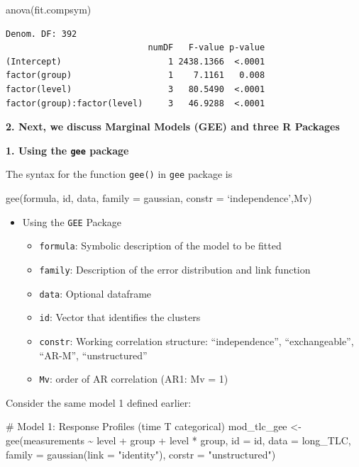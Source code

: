 \documentclass[
  letterpaper,
  DIV=11,
  numbers=noendperiod]{scrreprt}
\newenvironment{Shaded}{\begin{snugshade}}{\end{snugshade}}
\newcommand{\AttributeTok}[1]{\textcolor[rgb]{0.40,0.45,0.13}{#1}}
\newcommand{\CommentTok}[1]{\textcolor[rgb]{0.37,0.37,0.37}{#1}}
\newcommand{\FunctionTok}[1]{\textcolor[rgb]{0.28,0.35,0.67}{#1}}
\newcommand{\NormalTok}[1]{\textcolor[rgb]{0.00,0.23,0.31}{#1}}
\newcommand{\OtherTok}[1]{\textcolor[rgb]{0.00,0.23,0.31}{#1}}
\newcommand{\SpecialCharTok}[1]{\textcolor[rgb]{0.37,0.37,0.37}{#1}}
\newcommand{\StringTok}[1]{\textcolor[rgb]{0.13,0.47,0.30}{#1}}
\providecommand{\tightlist}{%
  \setlength{\itemsep}{0pt}\setlength{\parskip}{0pt}}\usepackage{longtable,booktabs,array}
\begin{document}
\begin{Shaded}
\begin{Highlighting}[]
\FunctionTok{anova}\NormalTok{(fit.compsym)}
\end{Highlighting}
\end{Shaded}

\begin{verbatim}
Denom. DF: 392 
                            numDF   F-value p-value
(Intercept)                     1 2438.1366  <.0001
factor(group)                   1    7.1161   0.008
factor(level)                   3   80.5490  <.0001
factor(group):factor(level)     3   46.9288  <.0001
\end{verbatim}

\textbf{2. Next, we discuss Marginal Models (GEE) and three R Packages }

\textbf{1. Using the \texttt{gee} package}

The syntax for the function \texttt{gee()} in \texttt{gee} package is

gee(formula, id, data, family = gaussian, constr = `independence',Mv)

\begin{itemize}
\tightlist
\item
  Using the \texttt{GEE} Package

  \begin{itemize}
  \tightlist
  \item
    \texttt{formula}: Symbolic description of the model to be fitted
  \item
    \texttt{family}: Description of the error distribution and link
    function
  \item
    \texttt{data}: Optional dataframe
  \item
    \texttt{id}: Vector that identifies the clusters
  \item
    \texttt{constr}: Working correlation structure: ``independence'',
    ``exchangeable'', ``AR-M'', ``unstructured''
  \item
    \texttt{Mv}: order of AR correlation (AR1: Mv = 1)
  \end{itemize}
\end{itemize}

Consider the same model 1 defined earlier:

\begin{Shaded}
\begin{Highlighting}[]
\CommentTok{\# Model 1: Response Profiles (time T categorical)}
\NormalTok{mod\_tlc\_gee }\OtherTok{\textless{}{-}} \FunctionTok{gee}\NormalTok{(measurements }\SpecialCharTok{\textasciitilde{}}\NormalTok{ level }\SpecialCharTok{+}\NormalTok{ group }\SpecialCharTok{+}\NormalTok{ level }\SpecialCharTok{*}\NormalTok{ group, }\AttributeTok{id =}\NormalTok{ id, }\AttributeTok{data =}\NormalTok{ long\_TLC,}
    \AttributeTok{family =} \FunctionTok{gaussian}\NormalTok{(}\AttributeTok{link =} \StringTok{"identity"}\NormalTok{), }\AttributeTok{corstr =} \StringTok{"unstructured"}\NormalTok{)}
\end{Highlighting}
\end{Shaded}
\end{document}
